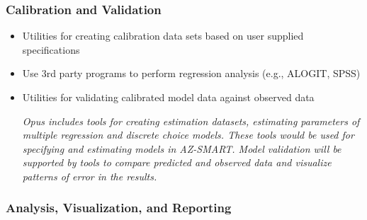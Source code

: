 \subsubsection{Calibration and Validation}

\begin{itemize}

\item Utilities for creating calibration data sets based on user supplied specifications
\item Use 3rd party programs to perform regression analysis (e.g., ALOGIT, SPSS)
\item Utilities for validating calibrated model data against observed data

\emph{Opus includes tools for creating estimation datasets, estimating parameters of multiple regression and discrete choice models.  These tools would be used for specifying and estimating models in AZ-SMART.  Model validation will be supported by tools to compare predicted and observed data and visualize patterns of error in the results.}

\end{itemize}

\subsubsection{Analysis, Visualization, and Reporting}


